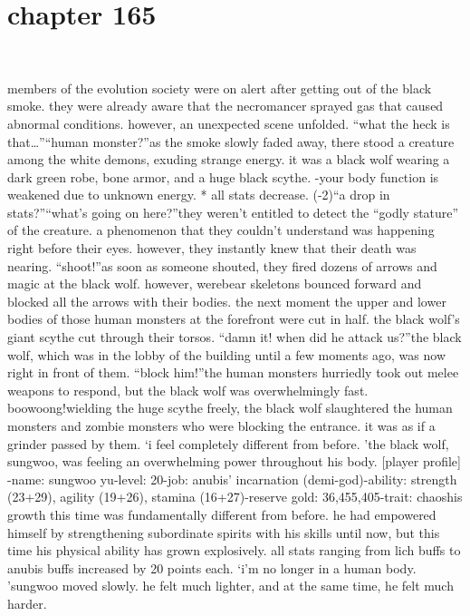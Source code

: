 \section{chapter 165}

                             




members of the evolution society were on alert after getting out of the black smoke.
 they were already aware that the necromancer sprayed gas that caused abnormal conditions.
however, an unexpected scene unfolded.
“what the heck is that…”“human monster?”as the smoke slowly faded away, there stood a creature among the white demons, exuding strange energy.
 it was a black wolf wearing a dark green robe, bone armor, and a huge black scythe.
-your body function is weakened due to unknown energy.
* all stats decrease.
 (-2)“a drop in stats?”“what’s going on here?”they weren’t entitled to detect the “godly stature” of the creature.
 a phenomenon that they couldn’t understand was happening right before their eyes.
however, they instantly knew that their death was nearing.
“shoot!”as soon as someone shouted, they fired dozens of arrows and magic at the black wolf.
however, werebear skeletons bounced forward and blocked all the arrows with their bodies.
 the next moment the upper and lower bodies of those human monsters at the forefront were cut in half.
 the black wolf’s giant scythe cut through their torsos.
“damn it! when did he attack us?”the black wolf, which was in the lobby of the building until a few moments ago, was now right in front of them.
“block him!”the human monsters hurriedly took out melee weapons to respond, but the black wolf was overwhelmingly fast.
boowoong!wielding the huge scythe freely, the black wolf slaughtered the human monsters and zombie monsters who were blocking the entrance.
 it was as if a grinder passed by them.
‘i feel completely different from before.
’the black wolf, sungwoo, was feeling an overwhelming power throughout his body.
[player profile]
-name: sungwoo yu-level: 20-job: anubis’ incarnation (demi-god)-ability: strength (23+29), agility (19+26), stamina (16+27)-reserve gold: 36,455,405-trait: chaoshis growth this time was fundamentally different from before.
 he had empowered himself by strengthening subordinate spirits with his skills until now, but this time his physical ability has grown explosively.
all stats ranging from lich buffs to anubis buffs increased by 20 points each.
‘i’m no longer in a human body.
’sungwoo moved slowly.
 he felt much lighter, and at the same time, he felt much harder.
